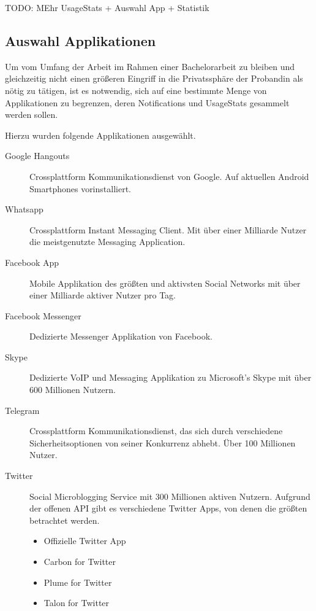 TODO: MEhr UsageStats + Auswahl App + Statistik

\subsection{Auswahl Applikationen}

Um vom Umfang der Arbeit im Rahmen einer Bachelorarbeit zu bleiben und gleichzeitig nicht einen größeren Eingriff in die Privatssphäre der Probandin als nötig zu tätigen,
ist es notwendig, sich auf eine bestimmte Menge von Applikationen zu begrenzen, deren Notifications und UsageStats gesammelt werden sollen.

Hierzu wurden folgende Applikationen ausgewählt.
\begin{description}
  \item [Google Hangouts] Crossplattform Kommunikationsdienst von Google. Auf aktuellen Android Smartphones vorinstalliert.
  \item [Whatsapp] Crossplattform Instant Messaging Client. Mit über einer Milliarde Nutzer die meistgenutzte Messaging Application\cite{whatsappuser}.
  \item [Facebook App] Mobile Applikation des größten und aktivsten Social Networks mit über einer Milliarde aktiver Nutzer pro Tag\cite{facebookuser}.
  \item [Facebook Messenger] Dedizierte Messenger Applikation von Facebook.
  \item [Skype] Dedizierte VoIP und Messaging Applikation zu Microsoft's Skype mit über 600 Millionen Nutzern\cite{skypeuser}.
  \item [Telegram] Crossplattform Kommunikationsdienst, das sich durch verschiedene Sicherheitsoptionen von seiner Konkurrenz abhebt. Über 100 Millionen Nutzer\cite{telegramuser}.
  \item [Twitter] Social Microblogging Service mit 300 Millionen aktiven Nutzern. Aufgrund der offenen API gibt es verschiedene Twitter Apps, von denen die größten betrachtet werden.
  \begin{itemize}
      \item Offizielle Twitter App
      \item Carbon for Twitter
      \item Plume for Twitter
      \item Talon for Twitter
  \end{itemize}
\end{description}




